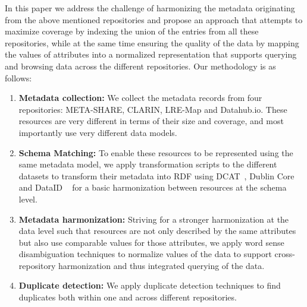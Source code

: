 \documentclass[11pt]{article}
\begin{document}
In this paper we address the challenge of harmonizing the metadata originating from the above mentioned repositories and propose an approach that attempts to maximize coverage by indexing the union of the entries from all these repositories, while at the same time ensuring the quality of the data by mapping the values of attributes into a normalized representation that supports querying and browsing data across the different repositories. Our methodology is as follows:

\begin{enumerate}
\item \textbf{Metadata collection:} We collect the metadata records from four repositories: META-SHARE, CLARIN, LRE-Map and Datahub.io. These resources are very
different in terms of their size and coverage, and most importantly use very
different data models.
\item \textbf{Schema Matching:} To enable these resources to be represented using the same metadata
model, we apply transformation scripts to the different datasets to transform their metadata into RDF using DCAT~\cite{maali2014data}, Dublin Core~\cite{weibel1998dublin} and DataID ~\cite{brummer2014dataid} for a basic harmonization between resources at the schema level. 
\item \textbf{Metadata harmonization:} Striving for a stronger harmonization at
    the data level such that resources are not only described by the same
    attributes but also use comparable values for those attributes, we apply word sense
    disambiguation techniques to normalize values of the data to support
    cross-repository harmonization and thus integrated querying of the data.%
\item \textbf{Duplicate detection:} We apply duplicate detection techniques to find duplicates both within one and across different repositories.
\end{enumerate}

\end{document}
